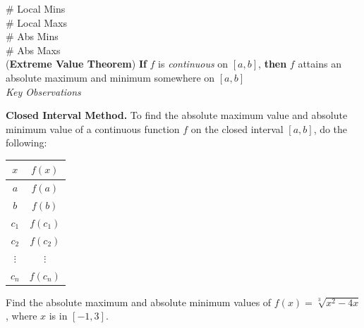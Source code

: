 \documentclass[10pt]{article}
\begin{document}
{\begin{flushleft}
    \end{flushleft}
}{
\# Local Mins \\
\# Local Maxs\\
\# Abs Mins \\
\# Abs Maxs
}
~\\
 ({\bf Extreme Value Theorem}) {\bf If} $f$ is {\em continuous} on $[a,b]$, {\bf then} $f$ attains an absolute maximum and minimum somewhere on $[a,b]$
\\
{\em Key Observations}

\newpage

{\bf {} Closed Interval Method.} To find the absolute maximum value and absolute minimum value of a continuous function $f$ on the closed interval $[a, b]$, do the following:
\smallskip

\begin{minipage}{0.75\textwidth}
\end{minipage}
%
\hfill
%
\begin{minipage}{0.2\textwidth}
\begin{center}
\begin{tabular}{|c|c|}
\hline 
$x$ & $f(x)$\tabularnewline
\hline 
\hline 
$a$ & $f(a)$\tabularnewline
\hline 
$b$ & $f(b)$\tabularnewline
\hline 
$c_1$ & $f(c_1)$\tabularnewline
\hline 
$c_2$ & $f(c_2)$\tabularnewline
\hline 
$\vdots$ &$\vdots $\tabularnewline
\hline 
$c_n$ & $f(c_n)$\tabularnewline
\hline 
\end{tabular}
\end{center}
\end{minipage}
 {\example} Find the absolute maximum and absolute minimum values of $f(x)=\sqrt[3]{x^2-4x}$, where $x$ is in $[-1,3]$.
\end{document}
